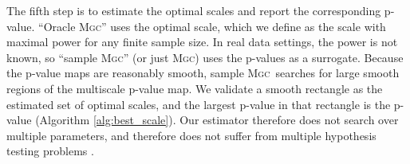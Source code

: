 \documentclass[11pt]{article}
\providecommand{\sct}[1]{{\normalfont\textsc{#1}}}
\newcommand{\Mgc}{\sct{Mgc}}
\begin{document}
The fifth step is to estimate the optimal scales and report the corresponding p-value.  ``Oracle \Mgc'' uses the optimal scale, which we define as the scale with maximal power for any finite sample size. In real data settings, the power is not known, so  ``sample \Mgc'' (or just \Mgc) uses the p-values as a surrogate. 
Because the p-value maps are reasonably smooth, sample \Mgc~searches for large smooth regions of the multiscale p-value map.  We validate a smooth rectangle as the estimated set of optimal scales, and the largest p-value in that rectangle is the p-value (Algorithm \ref{alg:best_scale}).
Our estimator therefore does not search over multiple parameters, and therefore does not suffer from multiple hypothesis testing problems \cite{Benjamini1995}.
\end{document}
